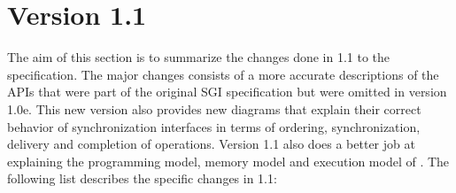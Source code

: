 \section{Version 1.1}
The aim of this section is to summarize the changes done in 1.1 to the \openshmem specification. 
The major changes consists of a more accurate descriptions of the \openshmem \acp{API} that 
were part of the original SGI specification but were omitted in version 1.0e. This new version also provides new
diagrams that explain their correct behavior of \openshmem synchronization interfaces in terms of ordering, synchronization, delivery and
completion of operations. Version 1.1 also does a better job at explaining the programming model, memory model and execution model  
of \openshmem. The following list describes the specific changes in 1.1:

